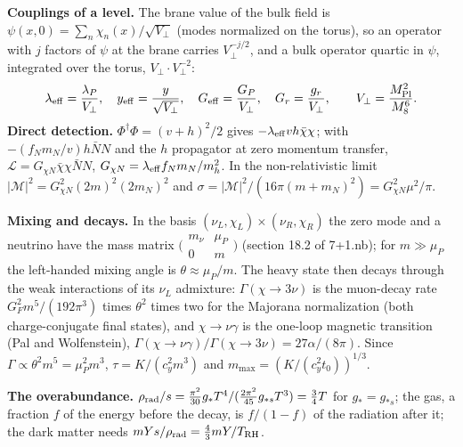 \documentclass[10pt,a4paper]{article}
\begin{document}
\textbf{Couplings of a level.} The brane value of the bulk field is $\psi(x,0)=\sum_n\chi_n(x)/\sqrt{V_\perp}$ (modes normalized on the torus), so an operator with $j$ factors of $\psi$ at the brane carries $V_\perp^{-j/2}$, and a bulk operator quartic in $\psi$, integrated over the torus, $V_\perp\cdot V_\perp^{-2}$:
\begin{equation*}
\lambda_{\rm eff}=\frac{\lambda_P}{V_\perp},\quad y_{\rm eff}=\frac{y}{\sqrt{V_\perp}},\quad G_{\rm eff}=\frac{G_P}{V_\perp},\quad G_r=\frac{g_r}{V_\perp},\qquad V_\perp=\frac{M_{\rm Pl}^2}{M_8^6}.
\end{equation*}
\textbf{Direct detection.} $\Phi^\dagger\Phi=(v+h)^2/2$ gives $-\lambda_{\rm eff}vh\bar\chi\chi$; with $-(f_Nm_N/v)h\bar NN$ and the $h$ propagator at zero momentum transfer, $\mathcal L=G_{\chi N}\bar\chi\chi\bar NN$, $G_{\chi N}=\lambda_{\rm eff}f_Nm_N/m_h^2$. In the non-relativistic limit $|\mathcal M|^2=G_{\chi N}^2(2m)^2(2m_N)^2$ and $\sigma=|\mathcal M|^2/(16\pi(m+m_N)^2)=G_{\chi N}^2\mu^2/\pi$.

\textbf{Mixing and decays.} In the basis $(\nu_L,\chi_L)\times(\nu_R,\chi_R)$ the zero mode and a neutrino have the mass matrix $\big(\begin{smallmatrix}m_\nu&\mu_P\\0&m\end{smallmatrix}\big)$ (section 18.2 of 7+1.nb); for $m\gg\mu_P$ the left-handed mixing angle is $\theta\approx\mu_P/m$. The heavy state then decays through the weak interactions of its $\nu_L$ admixture: $\Gamma(\chi\to3\nu)$ is the muon-decay rate $G_F^2m^5/(192\pi^3)$ times $\theta^2$ times two for the Majorana normalization (both charge-conjugate final states), and $\chi\to\nu\gamma$ is the one-loop magnetic transition (Pal and Wolfenstein), $\Gamma(\chi\to\nu\gamma)/\Gamma(\chi\to3\nu)=27\alpha/(8\pi)$. Since $\Gamma\propto\theta^2m^5=\mu_P^2m^3$, $\tau=K/(c_y^2m^3)$ and $m_{\max}=(K/(c_y^2t_0))^{1/3}$.

\textbf{The overabundance.} $\rho_{\rm rad}/s=\frac{\pi^2}{30}g_*T^4/(\frac{2\pi^2}{45}g_{*s}T^3)=\frac34T$ for $g_*=g_{*s}$; the gas, a fraction $f$ of the energy before the decay, is $f/(1-f)$ of the radiation after it; the dark matter needs $mYs/\rho_{\rm rad}=\frac43mY/T_{\rm RH}$.
\end{document}
